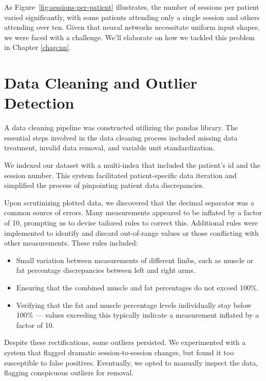 As Figure~\ref{fig:sessions-per-patient} illustrates, the number of sessions
per patient varied significantly, with some patients attending only a single
session and others attending over ten. Given that neural networks necessitate
uniform input shapes, we were faced with a challenge. We'll elaborate on how we
tackled this problem in Chapter \ref{chap:nn}.

\section{Data Cleaning and Outlier Detection}

A data cleaning pipeline was constructed utilizing the \gls{pandas} library.
The essential steps involved in the data cleaning process included missing data
treatment, invalid data removal, and variable unit standardization.

We indexed our dataset with a multi-index that included the patient's id and
the session number. This system facilitated patient-specific data iteration and
simplified the process of pinpointing patient data discrepancies.

Upon scrutinizing plotted data, we discovered that the decimal separator was a
common source of errors. Many measurements appeared to be inflated by a factor
of 10, prompting us to devise tailored rules to correct this. Additional rules
were implemented to identify and discard out-of-range values or those
conflicting with other measurements. These rules included:

\begin{itemize}
	\item Small variation between measurements of different limbs, such as muscle or fat
	      percentage discrepancies between left and right arms.
	\item Ensuring that the combined muscle and fat percentages do not exceed 100\%.
	\item Verifying that the fat and muscle percentage levels individually stay below
	      100\% --- values exceeding this typically indicate a measurement inflated by a
	      factor of 10.
\end{itemize}

Despite these rectifications, some outliers persisted. We experimented with a
system that flagged dramatic session-to-session changes, but found it too
susceptible to false positives. Eventually, we opted to manually inspect the
data, flagging conspicuous outliers for removal.

